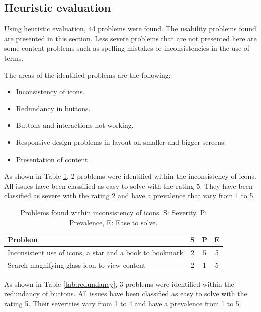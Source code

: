 \documentclass{sigchi}
\begin{document}
\subsection{Heuristic evaluation}
Using heuristic evaluation, 44 problems were found. The usability problems found are presented in this section. Less severe problems that are not presented here are some content problems such as spelling mistakes or inconsistencies in the use of terms. 

The areas of the identified problems are the following:

\begin{itemize}[noitemsep]
    \item Inconsistency of icons.
    \item Redundancy in buttons.
    \item Buttons and interactions not working.
    \item Responsive design problems in layout on smaller and bigger screens.
    \item Presentation of content.
\end{itemize}

As shown in Table \ref{tab:icons}, 2 problems were identified within the inconsistency of icons. All issues have been classified as easy to solve with the rating 5. They have been classified as severe with the rating 2 and have a prevalence that vary from 1 to 5. 

\begin{table}[H]
    \centering
    \begin{tabular}{|m{6.5cm}|c|c|c|}
    \hline
        \textbf{Problem} & \textbf{S} & \textbf{P} & \textbf{E}\\
    \hline
         Inconsistent use of icons, a star and a book to bookmark  & 2 & 5 & 5\\
    \hline
         Search magnifying glass icon to view content & 2 & 1 & 5\\
    \hline
    \end{tabular}
    \caption{Problems found within inconsistency of icons. S: Severity, P: Prevalence, E: Ease to solve.}
    \label{tab:icons}
\end{table}

As shown in Table \ref{tab:redundancy}, 3 problems were identified within the redundancy of buttons. All issues have been classified as easy to solve with the rating 5. Their severities vary from 1 to 4 and have a prevalence from 1 to 5.
\end{document}
